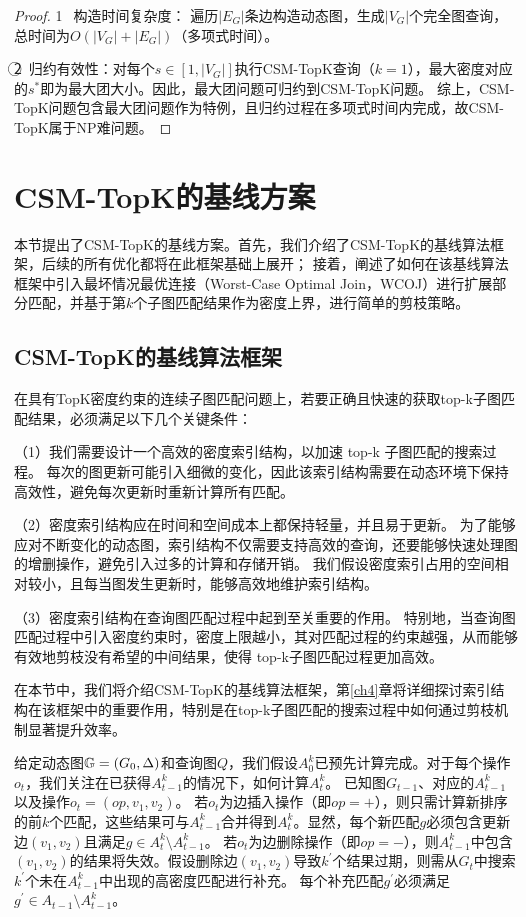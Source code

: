 \begin{proof}
        \textcircled{1}~构造时间复杂度：
        遍历$|E_G|$条边构造动态图，生成$|V_G|$个完全图查询，总时间为$O(|V_G|+|E_G|)$（多项式时间）。
        
        \textcircled{2}~归约有效性：对每个$s\in[1,|V_G|]$执行CSM-TopK查询（$k=1$），最大密度对应的$s^*$即为最大团大小。因此，最大团问题可归约到CSM-TopK问题。
        综上，CSM-TopK问题包含最大团问题作为特例，且归约过程在多项式时间内完成，故CSM-TopK属于NP难问题。
        \end{proof}
\section{CSM-TopK的基线方案}
本节提出了CSM-TopK的基线方案。首先，我们介绍了CSM-TopK的基线算法框架，后续的所有优化都将在此框架基础上展开；
接着，阐述了如何在该基线算法框架中引入最坏情况最优连接（Worst-Case Optimal Join，WCOJ）进行扩展部分匹配，并基于第$k$个子图匹配结果作为密度上界，进行简单的剪枝策略。
\subsection{CSM-TopK的基线算法框架}
\label{ch3:base-framework}
在具有TopK密度约束的连续子图匹配问题上，若要正确且快速的获取top-k子图匹配结果，必须满足以下几个关键条件：

（1）我们需要设计一个高效的密度索引结构，以加速 top-k 子图匹配的搜索过程。
每次的图更新可能引入细微的变化，因此该索引结构需要在动态环境下保持高效性，避免每次更新时重新计算所有匹配。

（2）密度索引结构应在时间和空间成本上都保持轻量，并且易于更新。
为了能够应对不断变化的动态图，索引结构不仅需要支持高效的查询，还要能够快速处理图的增删操作，避免引入过多的计算和存储开销。
我们假设密度索引占用的空间相对较小，且每当图发生更新时，能够高效地维护索引结构。

（3）密度索引结构在查询图匹配过程中起到至关重要的作用。
特别地，当查询图匹配过程中引入密度约束时，密度上限越小，其对匹配过程的约束越强，从而能够有效地剪枝没有希望的中间结果，使得 top-k子图匹配过程更加高效。

在本节中，我们将介绍CSM-TopK的基线算法框架，第\ref{ch4}章将详细探讨索引结构在该框架中的重要作用，特别是在top-k子图匹配的搜索过程中如何通过剪枝机制显著提升效率。


给定动态图$\mathbb{G}=(G_0, \Delta)$和查询图$Q$，我们假设$A_0^k$已预先计算完成。对于每个操作$o_t$，我们关注在已获得$A_{t-1}^k$的情况下，如何计算$A_t^k$。
已知图$G_{t-1}$、对应的$A_{t-1}^k$以及操作$o_t=(op, v_1, v_2)$。
若$o_t$为边插入操作（即$op=+$），则只需计算新排序的前$k$个匹配，这些结果可与$A_{t-1}^k$合并得到$A_t^k$。显然，每个新匹配$g$必须包含更新边$(v_1, v_2)$且满足$g\in A_t^k\setminus A_{t-1}^k$。
若$o_t$为边删除操作（即$op=-$），则$A_{t-1}^k$中包含$(v_1, v_2)$的结果将失效。假设删除边$(v_1, v_2)$导致$k^\prime$个结果过期，则需从$G_t$中搜索$k^\prime$个未在$A_{t-1}^k$中出现的高密度匹配进行补充。
每个补充匹配$g^\prime$必须满足$g^\prime \in A_{t-1} \setminus A_{t-1}^k$。

